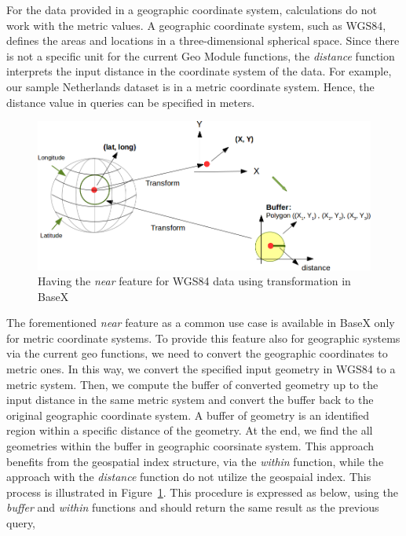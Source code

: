 \documentclass[a4paper,12pt]{article}
\begin{document}
For the data provided in a geographic coordinate system, calculations do not work with the metric values. A geographic coordinate system, such as WGS84, defines the areas and locations in a three-dimensional spherical space. Since there is not a specific unit for the current Geo Module functions, the \textit{distance} function interprets the input distance in the coordinate system of the data. For example, our sample Netherlands dataset is in a metric coordinate system. Hence,  the distance value in queries can be specified in meters. %

\begin{figure}
\centering
\includegraphics[width=\textwidth]{Transform}
\caption{Having the \textit{near} feature for WGS84 data using transformation in BaseX}
\label{figTransform}
\end{figure}

The forementioned \textit{near} feature as a common use case is available in BaseX only for metric coordinate systems. To provide this feature also for geographic systems via the current geo functions, we need to convert the geographic coordinates to metric ones. In this way, we convert the specified input geometry in WGS84 to a metric system. Then, we compute the buffer of converted geometry up to the input distance in the same metric system and convert the buffer back to the original geographic coordinate system. A buffer of geometry is an identified region within a specific distance of the geometry. At the end, we find the all geometries within the buffer in geographic coorsinate system. This approach benefits from the geospatial index structure, via the \textit{within} function, while the approach with the \textit{distance} function do not utilize the geospaial index. This process is illustrated in Figure~\ref{figTransform}. 
This procedure is expressed as below, using the \textit{buffer} and \textit{within} functions and should return the same result as the previous query, 
\end{document}
